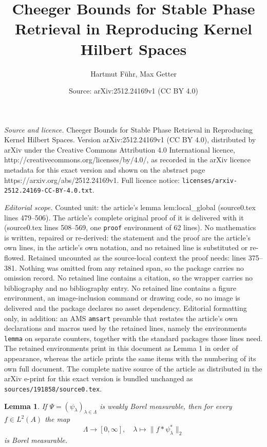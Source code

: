 \documentclass[10pt,a4paper]{amsart}
\title{Cheeger Bounds for Stable Phase Retrieval in Reproducing Kernel Hilbert Spaces}
\author{Hartmut F\"uhr, Max Getter}
\date{Source: arXiv:2512.24169v1 (CC BY 4.0)}
\newtheorem{lemma}{Lemma}
\begin{document}
\maketitle

\noindent\emph{Source and licence.} Cheeger Bounds for Stable Phase Retrieval in Reproducing Kernel Hilbert Spaces. Version arXiv:2512.24169v1 (CC BY 4.0), distributed by arXiv under the Creative Commons Attribution 4.0 International licence, http://creativecommons.org/licenses/by/4.0/, as recorded in the arXiv licence metadata for this exact version and shown on the abstract page https://arxiv.org/abs/2512.24169v1. Full licence notice: \texttt{licenses/arxiv-2512.24169-CC-BY-4.0.txt}.\par\smallskip

\noindent\textit{Editorial scope.} Counted unit: the article's lemma lem:local\_global (source0.tex lines 479--506). The article's complete original proof of it is delivered with it (source0.tex lines 508--569, one \texttt{proof} environment of 62 lines). No mathematics is written, repaired or re-derived: the statement and the proof are the article's own lines, in the article's own notation, and no retained line is substituted or re-flowed.  Retained uncounted as the source-local context the proof needs: lines 375--381.  Nothing was omitted from any retained span, so the package carries no omission record.  No retained line contains a citation, so the wrapper carries no bibliography and no bibliography entry.  No retained line contains a figure environment, an image-inclusion command or drawing code, so no image is delivered and the package declares no asset dependency.  Editorial formatting only, in addition: an AMS \texttt{amsart} preamble that restates the article's own declarations and macros used by the retained lines, namely the environments \texttt{lemma} on separate counters, together with the standard packages those lines need.  The retained environments print in this document as Lemma 1 in order of appearance, whereas the article prints the same items with the numbering of its own full document.  The complete native source of the article as distributed in the arXiv e-print for this exact version is bundled unchanged as \texttt{sources/191858/source0.tex}.
\begin{lemma} \label{lem:norm_Borel}
	If $\Psi = (\psi_\lambda)_{\lambda \in \Lambda}$ is weakly Borel measurable, then for every $f \in L^2(A)$ the map 
	\[
	\Lambda \to [0,\infty], \quad \lambda \mapsto \| f \ast \psi_\lambda^* \|_2
	\]
	is Borel measurable.
\end{lemma}
\end{document}
